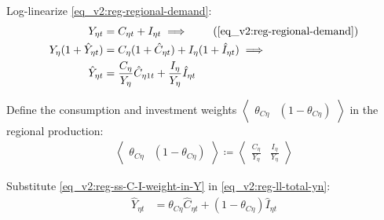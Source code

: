 \documentclass[../thesis.tex]{subfiles}
\begin{document}
\begin{tcolorbox}[colback=red!5!white,colframe=red!75!black]
	
Log-linearize \ref{eq_v2:reg-regional-demand}:
\begin{align}
	Y_{\eta t} &= C_{\eta t} + I_{\eta t} \implies \tag{\ref{eq_v2:reg-regional-demand}} \\
	Y_{\eta} (1 +\hat{Y}_{\eta t}) &= C_{\eta} (1 +\hat{C}_{\eta t}) + I_{\eta} (1 +\hat{I}_{\eta t}) \implies \nonumber \\
	\hat{Y}_{\eta t} &= \frac{C_{\eta}}{Y_{\eta}} \hat{C}_{\eta 1 t} + \frac{I_{\eta}}{Y_{\eta}} \hat{I}_{\eta t} \label{eq_v2:reg-ll-total-yn}
\end{align}

Define the consumption and investment weights $\left\langle \begin{smallmatrix} \theta_{C\eta} & (1 - \theta_{C\eta}) \end{smallmatrix} \right\rangle$ in the regional production:
\begin{align}
	\left\langle \begin{matrix} \theta_{C\eta} & (1 - \theta_{C\eta}) \end{matrix} \right\rangle \coloneq \left\langle \begin{matrix} \frac{C_{\eta}}{Y_{\eta}} & \frac{I_{\eta}}{Y_{\eta}} \end{matrix} \right\rangle \label{eq_v2:reg-ss-C-I-weight-in-Y}
\end{align}

Substitute \ref{eq_v2:reg-ss-C-I-weight-in-Y} in \ref{eq_v2:reg-ll-total-yn}:
\begin{align}
	\hat{Y}_{\eta t} &= \theta_{C\eta} \hat{C}_{\eta t} + (1 - \theta_{C\eta}) \hat{I}_{\eta t} \label{eq_v2:reg-ll-total-yn-2}
\end{align}

\end{tcolorbox}

\end{document}
